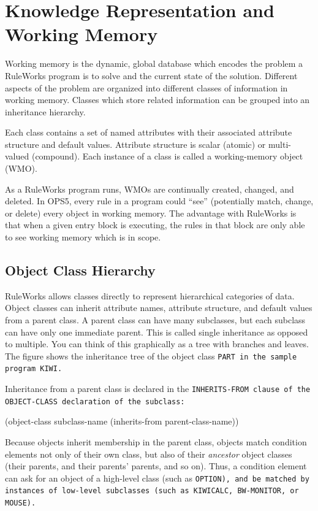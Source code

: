 \chapter[Working Memory]{Knowledge Representation and 
  Working Memory}
\label{c:workingmem}

Working memory is the dynamic, global database which encodes
the problem a RuleWorks program is to solve and the current
state of the solution. Different aspects of the problem are
organized into different classes of information in working
memory. Classes which store related information can be
grouped into an inheritance hierarchy.

Each class contains a set of named attributes with their
associated attribute structure and default values. Attribute
structure is scalar (atomic) or multi-valued (compound). Each
instance of a class is called a working-memory object (WMO).

As a RuleWorks program runs, WMOs are continually created,
changed, and deleted. In OPS5, every rule in a program could
``see'' (potentially match, change, or delete) every object in
working memory. The advantage with RuleWorks is that when a
given entry block is executing, the rules in that block are
only able to see working memory which is in scope.

\section{Object Class Hierarchy}

RuleWorks allows classes directly to represent hierarchical
categories of data. Object classes can inherit attribute
names, attribute structure, and default values from a parent
class. A parent class can have many subclasses, but each
subclass can have only one immediate parent. This is called
single inheritance as opposed to multiple. You can think of
this graphically as a tree with branches and leaves. The
figure shows the inheritance tree of the object class \tt{PART} in
the sample program \tt{KIWI}.

Inheritance from a parent class is declared in the
\tt{INHERITS-FROM} clause of the \tt{OBJECT-CLASS} declaration of the
subclass:
\begin{qv}
(object-class subclass-name
    (inherits-from parent-class-name))
\end{qv}
  
Because objects inherit membership in the parent class, objects match
condition elements not only of their own class, but also of their
\emph{ancestor} object classes (their parents, and their parents'
parents, and so on). Thus, a condition element can ask for an object
of a high-level class (such as \tt{OPTION}), and be matched by
instances of low-level subclasses (such as \tt{KIWICALC},
\tt{BW-MONITOR}, or \tt{MOUSE}).

